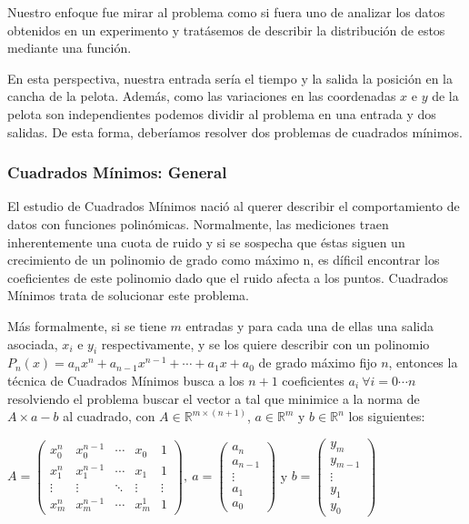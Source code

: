 
Nuestro enfoque fue mirar al problema como si fuera uno de analizar los datos obtenidos en un
experimento y tratásemos de describir la distribución de estos mediante una función.

En esta perspectiva, nuestra entrada sería el tiempo y la salida la posición en la cancha de la
pelota. Además, como las variaciones en las coordenadas $x$ e $y$ de la pelota son independientes
podemos dividir al problema en una entrada y dos salidas. De esta forma, deberíamos resolver dos
problemas de cuadrados mínimos.

\subsubsection{Cuadrados Mínimos: General}
El estudio de Cuadrados Mínimos nació al querer describir el comportamiento de datos con funciones
polinómicas. Normalmente, las mediciones traen inherentemente una cuota de ruido y si se sospecha
que éstas siguen un crecimiento de un polinomio de grado como máximo n, es díficil encontrar los
coeficientes de este polinomio dado que el ruido afecta a los puntos. Cuadrados Mínimos trata de
solucionar este problema.

Más formalmente, si se tiene $m$ entradas y para cada una de ellas una salida asociada, $x_i$ e
$y_i$ respectivamente, y se los quiere describir con un polinomio $P_n(x) = a_n x^n+a_{n-1}x^{n-1} +
\cdots + a_1x + a_0$ de grado máximo fijo $n$, entonces la técnica de Cuadrados Mínimos busca a los
$n+1$ coeficientes $a_i \ \forall i=0\cdots n$ resolviendo el problema buscar el vector a tal que
minimice a la norma de $A \times a - b$ al cuadrado, con $A \in \mathbb{R}^{m\times (n+1)}$,
$a \in \mathbb{R}^m$ y $b \in \mathbb{R}^n$ los siguientes:

  $ A = \begin{pmatrix}
    x_0^n & x_0^{n-1} & \cdots &  x_0  & 1 \\
    x_1^{n} & x_1^{n-1} & \cdots & x_1 & 1 \\
    \vdots  & \vdots  & \ddots & \vdots  & \vdots \\
    x_m^{n} & x_m^{n-1} & \cdots & x_m^1 & 1
              \end{pmatrix}, \ 
   a = \begin{pmatrix}
        a_n \\
        a_{n-1} \\
        \vdots \\
        a_1 \\
        a_0
       \end{pmatrix}
  $ y $
  b = \begin{pmatrix}
        y_m \\
        y_{m-1} \\
        \vdots \\
        y_1 \\
        y_0
       \end{pmatrix}
  $

